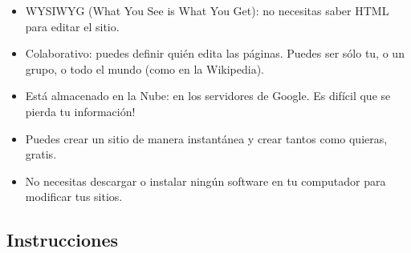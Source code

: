 \documentclass[letterpaper]{article}
\begin{document}
\begin{itemize}
\item WYSIWYG (What You See is What You Get): no necesitas saber HTML
  para editar el sitio.

\item Colaborativo: puedes definir quién edita las páginas. Puedes ser
  sólo tu, o un grupo, o todo el mundo (como en la Wikipedia).

\item Está almacenado en la Nube: en los servidores de Google. Es
  difícil que se pierda tu información!

\item Puedes crear un sitio de manera instantánea y crear tantos como
  quieras, gratis.

\item No necesitas descargar o instalar ningún software en tu
  computador para modificar tus sitios.
\end{itemize}

\subsection*{Instrucciones}
\end{document}
